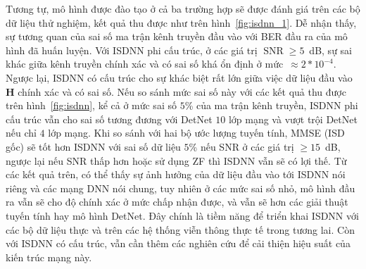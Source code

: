 Tương tự, mô hình được đào tạo ở cả ba trường hợp sẽ được đánh giá trên các bộ dữ liệu thử nghiệm, kết quả thu được như trên hình~\ref{fig:isdnn_1}. Dễ nhận thấy, sự tương quan của sai số ma trận kênh truyền đầu vào với BER đầu ra của mô hình đã huấn luyện. Với ISDNN phi cấu trúc, ở các giá trị $\operatorname{SNR}\ge 5$~dB, sự sai khác giữa kênh truyền chính xác và có sai số khá ổn định ở mức~$\approx 2 * 10^{-4}$. Ngược lại, ISDNN có cấu trúc cho sự khác biệt rất lớn giữa việc dữ liệu đầu vào $\mathbf{H}$ chính xác và có sai số. Nếu so sánh mức sai số này với các kết quả thu được trên hình~\ref{fig:isdnn}, kể cả ở mức sai số $5$\% của ma trận kênh truyền, ISDNN phi cấu trúc vẫn cho sai số tương đương với DetNet $10$ lớp mạng và vượt trội DetNet nếu chỉ $4$ lớp mạng. Khi so sánh với hai bộ ước lượng tuyến tính, MMSE (ISD gốc) sẽ tốt hơn ISDNN với sai số dữ liệu $5$\% nếu SNR ở các giá trị $\ge 15$~dB, ngược lại nếu SNR thấp hơn hoặc sử dụng ZF thì ISDNN vẫn sẽ có lợi thế. Từ các kết quả trên, có thể thấy sự ảnh hưởng của dữ liệu đầu vào tới ISDNN nói riêng và các mạng DNN nói chung, tuy nhiên ở các mức sai số nhỏ, mô hình đầu ra vẫn sẽ cho độ chính xác ở mức chấp nhận được, và vẫn sẽ hơn các giải thuật tuyến tính hay mô hình DetNet. Đây chính là tiềm năng để triển khai ISDNN với các bộ dữ liệu thực và trên các hệ thống viễn thông thực tế trong tương lai. Còn với ISDNN có cấu trúc, vẫn cần thêm các nghiên cứu để cải thiện hiệu suất của kiến trúc mạng này.
